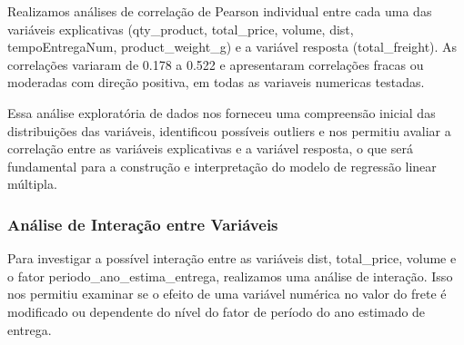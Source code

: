 \documentclass[
]{article}
\begin{document}
Realizamos análises de correlação de Pearson individual entre cada uma
das variáveis explicativas (qty\_product, total\_price, volume, dist,
tempoEntregaNum, product\_weight\_g) e a variável resposta
(total\_freight). As correlações variaram de 0.178 a 0.522 e
apresentaram correlações fracas ou moderadas com direção positiva, em
todas as variaveis numericas testadas.

Essa análise exploratória de dados nos forneceu uma compreensão inicial
das distribuições das variáveis, identificou possíveis outliers e nos
permitiu avaliar a correlação entre as variáveis explicativas e a
variável resposta, o que será fundamental para a construção e
interpretação do modelo de regressão linear múltipla.

\hypertarget{anuxe1lise-de-interauxe7uxe3o-entre-variuxe1veis}{%
\subsubsection{Análise de Interação entre
Variáveis}\label{anuxe1lise-de-interauxe7uxe3o-entre-variuxe1veis}}

Para investigar a possível interação entre as variáveis dist,
total\_price, volume e o fator periodo\_ano\_estima\_entrega, realizamos
uma análise de interação. Isso nos permitiu examinar se o efeito de uma
variável numérica no valor do frete é modificado ou dependente do nível
do fator de período do ano estimado de entrega.
\end{document}
